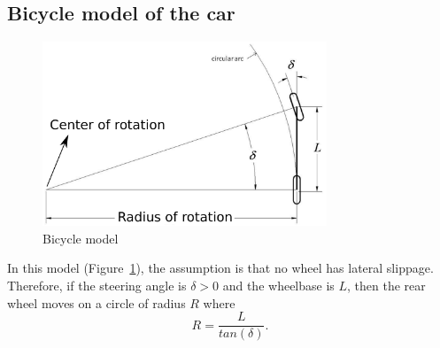 \subsection{Bicycle model of the car}

\begin{figure}
\centering
\includegraphics[width=85mm]{Figures/BicycleModel.pdf}%
\caption{Bicycle model \cite{Snider.2009}}
\label{fig:bicycle}%
\end{figure}
In this model (Figure~\ref{fig:bicycle}),
the assumption is that no wheel has lateral slippage.
Therefore,
if the steering angle is $\delta > 0$ and the wheelbase is $L$,
then the rear wheel moves on a circle of radius $R$ where
\begin{equation}
R = \frac{L}{tan(\delta)}.
\end{equation}